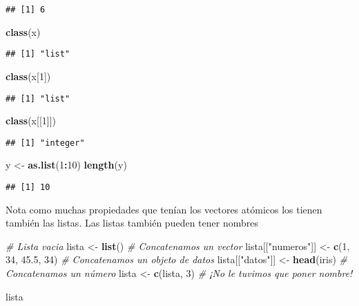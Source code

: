 \documentclass[]{article}
\newenvironment{Shaded}{\begin{snugshade}}{\end{snugshade}}
\newcommand{\KeywordTok}[1]{\textcolor[rgb]{0.13,0.29,0.53}{\textbf{#1}}}
\newcommand{\DecValTok}[1]{\textcolor[rgb]{0.00,0.00,0.81}{#1}}
\newcommand{\FloatTok}[1]{\textcolor[rgb]{0.00,0.00,0.81}{#1}}
\newcommand{\StringTok}[1]{\textcolor[rgb]{0.31,0.60,0.02}{#1}}
\newcommand{\CommentTok}[1]{\textcolor[rgb]{0.56,0.35,0.01}{\textit{#1}}}
\newcommand{\OperatorTok}[1]{\textcolor[rgb]{0.81,0.36,0.00}{\textbf{#1}}}
\newcommand{\NormalTok}[1]{#1}
\begin{document}
\begin{verbatim}
## [1] 6
\end{verbatim}

\begin{Shaded}
\begin{Highlighting}[]
\KeywordTok{class}\NormalTok{(x)}
\end{Highlighting}
\end{Shaded}

\begin{verbatim}
## [1] "list"
\end{verbatim}

\begin{Shaded}
\begin{Highlighting}[]
\KeywordTok{class}\NormalTok{(x[}\DecValTok{1}\NormalTok{])}
\end{Highlighting}
\end{Shaded}

\begin{verbatim}
## [1] "list"
\end{verbatim}

\begin{Shaded}
\begin{Highlighting}[]
\KeywordTok{class}\NormalTok{(x[[}\DecValTok{1}\NormalTok{]])}
\end{Highlighting}
\end{Shaded}

\begin{verbatim}
## [1] "integer"
\end{verbatim}

\begin{Shaded}
\begin{Highlighting}[]
\NormalTok{y <-}\StringTok{ }\KeywordTok{as.list}\NormalTok{(}\DecValTok{1}\OperatorTok{:}\DecValTok{10}\NormalTok{)}
\KeywordTok{length}\NormalTok{(y)}
\end{Highlighting}
\end{Shaded}

\begin{verbatim}
## [1] 10
\end{verbatim}

Nota como muchas propiedades que tenían los vectores atómicos los tienen
también las listas. Las listas también pueden tener nombres

\begin{Shaded}
\begin{Highlighting}[]
\CommentTok{# Lista vacia}
\NormalTok{lista <-}\StringTok{ }\KeywordTok{list}\NormalTok{()}
\CommentTok{# Concatenamos un vector}
\NormalTok{lista[[}\StringTok{"numeros"}\NormalTok{]] <-}\StringTok{ }\KeywordTok{c}\NormalTok{(}\DecValTok{1}\NormalTok{, }\DecValTok{34}\NormalTok{, }\FloatTok{45.5}\NormalTok{, }\DecValTok{34}\NormalTok{) }
\CommentTok{# Concatenamos un objeto de datos}
\NormalTok{lista[[}\StringTok{"datos"}\NormalTok{]] <-}\StringTok{ }\KeywordTok{head}\NormalTok{(iris)}
\CommentTok{# Concatenamos un número}
\NormalTok{lista <-}\StringTok{ }\KeywordTok{c}\NormalTok{(lista, }\DecValTok{3}\NormalTok{) }\CommentTok{# ¡No le tuvimos que poner nombre!}

\NormalTok{lista}
\end{Highlighting}
\end{Shaded}
\end{document}

